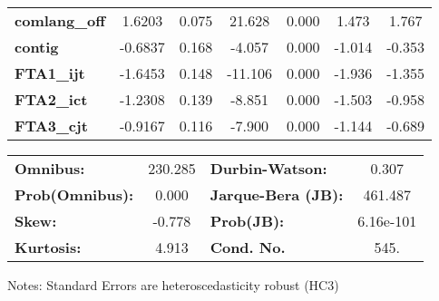 \begin{center}
\begin{tabular}{lcccccc}
\textbf{comlang\_off} &       1.6203  &        0.075     &    21.628  &         0.000        &        1.473    &        1.767     \\
\textbf{contig}       &      -0.6837  &        0.168     &    -4.057  &         0.000        &       -1.014    &       -0.353     \\
\textbf{FTA1\_ijt}    &      -1.6453  &        0.148     &   -11.106  &         0.000        &       -1.936    &       -1.355     \\
\textbf{FTA2\_ict}    &      -1.2308  &        0.139     &    -8.851  &         0.000        &       -1.503    &       -0.958     \\
\textbf{FTA3\_cjt}    &      -0.9167  &        0.116     &    -7.900  &         0.000        &       -1.144    &       -0.689     \\
\bottomrule
\end{tabular}
\begin{tabular}{lclc}
\textbf{Omnibus:}       & 230.285 & \textbf{  Durbin-Watson:     } &     0.307  \\
\textbf{Prob(Omnibus):} &   0.000 & \textbf{  Jarque-Bera (JB):  } &   461.487  \\
\textbf{Skew:}          &  -0.778 & \textbf{  Prob(JB):          } & 6.16e-101  \\
\textbf{Kurtosis:}      &   4.913 & \textbf{  Cond. No.          } &      545.  \\
\bottomrule
\end{tabular}
\end{center}

Notes: \newline
 [1] Standard Errors are heteroscedasticity robust (HC3)
